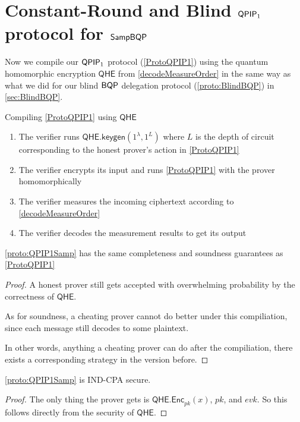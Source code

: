 \section{Constant-Round and Blind $\operatorname{\mathsf{QPIP}}_1$ protocol for $\operatorname{\mathsf{SampBQP}}$}

Now we compile our $\operatorname{\mathsf{QPIP}}_1$ protocol (\cref{ProtoQPIP1}) using the quantum homomorphic encryption $\mathsf{QHE}$ from \cref{decodeMeasureOrder} in the same way as what we did for our blind $\operatorname{\mathsf{BQP}}$ delegation protocol (\cref{proto:BlindBQP}) in \cref{sec:BlindBQP}.

\begin{protocol}{Compiling \cref{ProtoQPIP1} using $\mathsf{QHE}$}
	\label{proto:QPIP1Samp}
	\begin{enumerate}
		\item The verifier runs $\mathsf{QHE.keygen}(1^\lambda, 1^L)$ where $L$ is the depth of circuit corresponding to the honest prover's action in \cref{ProtoQPIP1}
		\item The verifier encrypts its input and runs \cref{ProtoQPIP1} with the prover homomorphically
		\item The verifier measures the incoming ciphertext according to \cref{decodeMeasureOrder}
		\item The verifier decodes the measurement results to get its output
	\end{enumerate}
\end{protocol}

\begin{thm}
	\cref{proto:QPIP1Samp} has the same completeness and soundness guarantees as \cref{ProtoQPIP1}
\end{thm}
\begin{proof}
	A honest prover still gets accepted with overwhelming probability by the correctness of $\mathsf{QHE}$. 

	As for soundness, a cheating prover cannot do better under this compiliation, since each message still decodes to some plaintext.

	In other words, anything a cheating prover can do after the compiliation, there exists a corresponding strategy in the version before.
\end{proof}

\begin{thm}
	\cref{proto:QPIP1Samp} is IND-CPA secure.
\end{thm}
\begin{proof}
	The only thing the prover gets is $\mathsf{QHE.Enc}_{pk}(x)$, $pk$, and $evk$. So this follows directly from the security of $\mathsf{QHE}$.
\end{proof}
